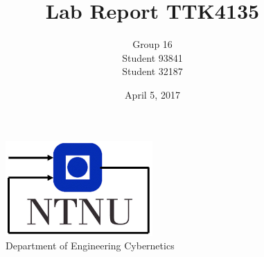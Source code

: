 \documentclass[11pt, a4paper, USenglish]{article} %
\begin{document}
\title{Lab Report TTK4135}
\author{Group 16\\Student 93841\\Student 32187}
\date{April 5, 2017}
\begin{titlepage}
    \maketitle
    \begin{figure}
    \centering
    \includegraphics[width=0.5\textwidth]{figures/itk_ntnu}\\
    Department of Engineering Cybernetics
    \end{figure}
    \thispagestyle{empty}
\end{titlepage}

\newpage

\thispagestyle{empty} %

\newpage
\tableofcontents
\thispagestyle{empty} %

\newpage
\setcounter{page}{1}







\newpage
{}
\printbibliography{}
\label{sec:bibliography}
\end{document}
